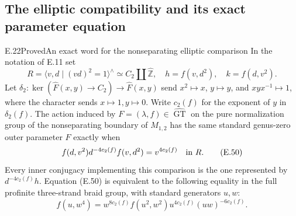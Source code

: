 \subsection{The elliptic compatibility and its exact parameter equation}
\begin{result}{E.22}{Proved}{An exact word for the nonseparating elliptic comparison}
In the notation of E.11 set
\[
 R=\langle v,d\mid(vd)^2=1\rangle^{\wedge}
       \simeq C_2\amalg\widehat{\mathbb Z},\quad
 h=f(v,d^2),\quad k=f(d,v^2).
\]
Let $\delta_2:\ker(\widehat F(x,y)\to C_2)\to
\widehat F(x,y)$ send $x^2\mapsto x$, $y\mapsto y$,
and $xyx^{-1}\mapsto1$, where the character sends
$x\mapsto1,y\mapsto0$.  Write $c_2(f)$ for the exponent
of $y$ in $\delta_2(f)$.  The action induced by
$F=(\lambda,f)\in\widehat{\operatorname{GT}}$ on the
pure normalization group of the nonseparating boundary
of $M_{1,2}$ has the same standard genus-zero outer
parameter $F$ exactly when
\[
 f(d,v^2)d^{-4c_2(f)}f(v,d^2)=v^{4c_2(f)}\quad\hbox{in }R.
                                                               \tag{E.50}
\]
Every inner conjugacy implementing this comparison is the
one represented by $d^{-4c_2(f)}h$.  Equation (E.50) is
equivalent to the following equality in the full profinite
three-strand braid group, with standard generators $u,w$:
\[
 f(u,w^4)=w^{8c_2(f)}f(u^2,w^2)u^{4c_2(f)}
                           (uw)^{-6c_2(f)}.                   \tag{E.51}
\]
\end{result}
